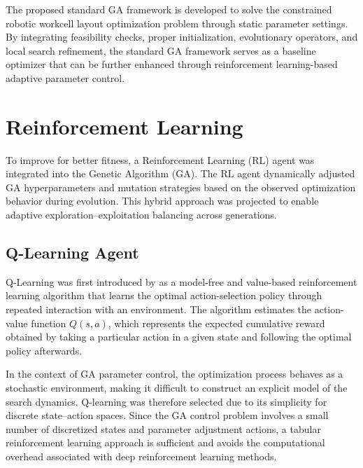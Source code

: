 \documentclass{article}
\begin{document}
The proposed standard GA framework is developed to solve the constrained robotic workcell layout optimization problem through static parameter settings. By integrating feasibility checks, proper initialization, evolutionary operators, and local search refinement, the standard GA framework serves as a baseline optimizer that can be further enhanced through reinforcement learning-based adaptive parameter control.

\newpage
\section{Reinforcement Learning}

To improve for better fitness, a Reinforcement Learning (RL) agent was integrated into the Genetic Algorithm (GA). The RL agent dynamically adjusted GA hyperparameters and mutation strategies based on the observed optimization behavior during evolution. This hybrid approach was projected to enable adaptive exploration–exploitation balancing across generations.

\subsection{Q-Learning Agent}
Q-Learning was first introduced by \textcite{watkinsqlearning} as a
model-free and value-based reinforcement learning algorithm that learns the optimal
action-selection policy through repeated interaction with an
environment. The algorithm estimates the action-value
function $Q(s,a)$, which represents the expected cumulative reward obtained by taking a particular action in a given state and following the optimal policy afterwards. 

In the context of GA parameter control, the optimization process behaves as a stochastic environment, making it difficult to construct an explicit model of the search dynamics. Q-learning was therefore selected due to its simplicity for discrete state–action spaces. Since the GA control problem involves a small number of discretized states and parameter adjustment actions, a tabular reinforcement learning approach is sufficient and avoids the computational overhead associated with deep reinforcement learning methods.
\end{document}
